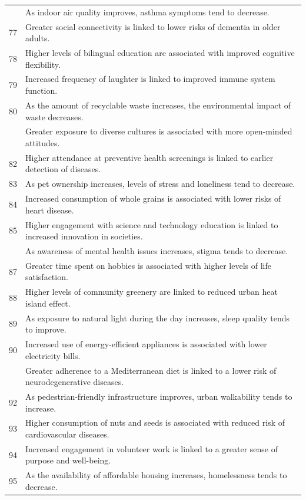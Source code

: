 \documentclass[
  letterpaper,
  DIV=11,
  numbers=noendperiod]{scrartcl}
\begin{document}
\begin{longtable}[t]{r>{\raggedright\arraybackslash}p{35em}}
\addlinespace
76 & As indoor air quality improves, asthma symptoms tend to decrease.\\
77 & Greater social connectivity is linked to lower risks of dementia in older adults.\\
78 & Higher levels of bilingual education are associated with improved cognitive flexibility.\\
79 & Increased frequency of laughter is linked to improved immune system function.\\
80 & As the amount of recyclable waste increases, the environmental impact of waste decreases.\\
\addlinespace
81 & Greater exposure to diverse cultures is associated with more open-minded attitudes.\\
82 & Higher attendance at preventive health screenings is linked to earlier detection of diseases.\\
83 & As pet ownership increases, levels of stress and loneliness tend to decrease.\\
84 & Increased consumption of whole grains is associated with lower risks of heart disease.\\
85 & Higher engagement with science and technology education is linked to increased innovation in societies.\\
\addlinespace
86 & As awareness of mental health issues increases, stigma tends to decrease.\\
87 & Greater time spent on hobbies is associated with higher levels of life satisfaction.\\
88 & Higher levels of community greenery are linked to reduced urban heat island effect.\\
89 & As exposure to natural light during the day increases, sleep quality tends to improve.\\
90 & Increased use of energy-efficient appliances is associated with lower electricity bills.\\
\addlinespace
91 & Greater adherence to a Mediterranean diet is linked to a lower risk of neurodegenerative diseases.\\
92 & As pedestrian-friendly infrastructure improves, urban walkability tends to increase.\\
93 & Higher consumption of nuts and seeds is associated with reduced risk of cardiovascular diseases.\\
94 & Increased engagement in volunteer work is linked to a greater sense of purpose and well-being.\\
95 & As the availability of affordable housing increases, homelessness tends to decrease.\\

\end{longtable}
\end{document}
